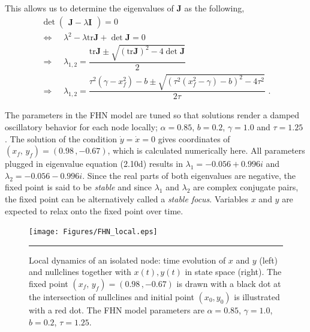 This allows us to determine the eigenvalues of \textbf{J} as the following,
\begin{subequations}
\begin{align} \det \begin{pmatrix} \textbf{J} - \lambda \textbf{I} \end{pmatrix} = 0
              \label{eqn: frobenius 8}\\  
\Leftrightarrow \;\;\;\; \lambda^2 - \lambda \mathrm{tr} \textbf{J} + \det \textbf{J} = 0
               \label{eqn: frobenius 9} \\
\Rightarrow \;\;\;\; \lambda_{1,2} = \dfrac{\mathrm{tr} \textbf{J} \pm \sqrt{ ( \mathrm{tr}  \textbf{J} )^2 -4 \det \textbf{J} } }{2}               
                \label{eqn: frobenius 10} \\    
\Rightarrow \;\;\;\; \lambda_{1,2} = \dfrac{\tau^2(\gamma - x_f^2)-b \pm \sqrt{(\tau^2(x_f^2-\gamma)-b)^2 - 4 \tau^2 }}{2 \tau} \,\, .
               \label{eqn: frobenius 11}                 
               \end{align} 
\end{subequations}

The parameters in the FHN model are tuned so that solutions render a damped oscillatory behavior for each node locally;  $\alpha = 0.85$, $b=0.2$, $\gamma=1.0$ and $\tau=1.25$ \citep{VUK13}. The solution of the condition $\dot{y}=\dot{x}=0$ gives coordinates of $(x_f, \, y_f) = (0.98 \, , -0.67 )$, which is calculated numerically here. All parameters plugged in eigenvalue equation (2.10d) results in $\lambda_1 = -0.056 + 0.996 i$ and $\lambda_2 = -0.056 - 0.996 i$. Since the real parts of both eigenvalues are negative, the fixed point is said to be \textit{stable} and since $\lambda_1$ and $\lambda_2$ are complex conjugate pairs, the fixed point can be alternatively called a \textit{stable focus}. Variables $x$ and $y$ are expected to relax onto the fixed point over time.  

\begin{figure}[htbp]
  \centering
	\texttt{[image: Figures/FHN\_local.eps]}
 
    \rule{35em}{0.5pt}
    \caption[FHN Local]{Local dynamics of an isolated node: time evolution of $x$ and  $y$ (left) and nullclines together with $x(t),y(t)$ in state space (right). The fixed point $(x_f, \, y_f) = (0.98 \, , -0.67 )$ is drawn with a black dot at the intersection of nullclines and initial point $(x_0, y_0)$ is illustrated with a red dot. The FHN model parameters are $\alpha=0.85$, $\gamma=1.0$, $b=0.2$, $\tau=1.25$. }
  \label{fig:FHN Local}	
\end{figure}

